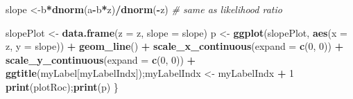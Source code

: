 \documentclass[
]{book}
\newenvironment{Shaded}{\begin{snugshade}}{\end{snugshade}}
\newcommand{\CommentTok}[1]{\textcolor[rgb]{0.56,0.35,0.01}{\textit{#1}}}
\newcommand{\DataTypeTok}[1]{\textcolor[rgb]{0.13,0.29,0.53}{#1}}
\newcommand{\DecValTok}[1]{\textcolor[rgb]{0.00,0.00,0.81}{#1}}
\newcommand{\KeywordTok}[1]{\textcolor[rgb]{0.13,0.29,0.53}{\textbf{#1}}}
\newcommand{\NormalTok}[1]{#1}
\newcommand{\OperatorTok}[1]{\textcolor[rgb]{0.81,0.36,0.00}{\textbf{#1}}}
\newcommand{\StringTok}[1]{\textcolor[rgb]{0.31,0.60,0.02}{#1}}
\begin{document}
\begin{Shaded}
\begin{Highlighting}[]
\NormalTok{  slope \textless{}{-}b}\OperatorTok{*}\KeywordTok{dnorm}\NormalTok{(a}\OperatorTok{{-}}\NormalTok{b}\OperatorTok{*}\NormalTok{z)}\OperatorTok{/}\KeywordTok{dnorm}\NormalTok{(}\OperatorTok{{-}}\NormalTok{z) }\CommentTok{\# same as likelihood ratio}
  
\NormalTok{  slopePlot \textless{}{-}}\StringTok{ }\KeywordTok{data.frame}\NormalTok{(}\DataTypeTok{z =}\NormalTok{ z, }\DataTypeTok{slope =}\NormalTok{ slope)}
\NormalTok{  p \textless{}{-}}\StringTok{ }\KeywordTok{ggplot}\NormalTok{(slopePlot, }\KeywordTok{aes}\NormalTok{(}\DataTypeTok{x =}\NormalTok{ z, }\DataTypeTok{y =}\NormalTok{ slope)) }\OperatorTok{+}\StringTok{ }
\StringTok{    }\KeywordTok{geom\_line}\NormalTok{()  }\OperatorTok{+}\StringTok{ }
\StringTok{    }\KeywordTok{scale\_x\_continuous}\NormalTok{(}\DataTypeTok{expand =} \KeywordTok{c}\NormalTok{(}\DecValTok{0}\NormalTok{, }\DecValTok{0}\NormalTok{)) }\OperatorTok{+}\StringTok{ }
\StringTok{    }\KeywordTok{scale\_y\_continuous}\NormalTok{(}\DataTypeTok{expand =} \KeywordTok{c}\NormalTok{(}\DecValTok{0}\NormalTok{, }\DecValTok{0}\NormalTok{))  }\OperatorTok{+}
\StringTok{    }\KeywordTok{ggtitle}\NormalTok{(myLabel[myLabelIndx]);myLabelIndx \textless{}{-}}\StringTok{ }\NormalTok{myLabelIndx }\OperatorTok{+}\StringTok{ }\DecValTok{1}
  \KeywordTok{print}\NormalTok{(plotRoc);}\KeywordTok{print}\NormalTok{(p)}
\NormalTok{\}}
\end{Highlighting}
\end{Shaded}
\end{document}
